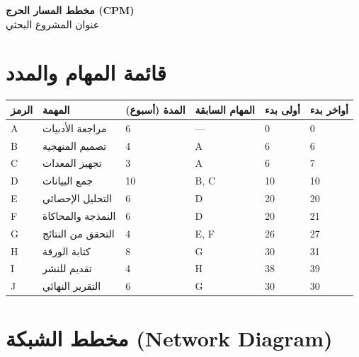 \documentclass[11pt,a4paper,landscape]{article}
\begin{document}
\begin{center}
{\LARGE\bfseries مخطط المسار الحرج (CPM)}\\[0.5em]
{\Large عنوان المشروع البحثي}\\[1em]
\end{center}

\section{قائمة المهام والمدد}
\label{sec:tasks}

\begin{table}[H]
\centering
\small
\renewcommand{\arraystretch}{1.3}
\begin{tabularx}{\textwidth}{C{1cm} L{5cm} C{2cm} C{3cm} C{2cm} C{2cm}}
\toprule
\textbf{الرمز} & \textbf{المهمة} & \textbf{المدة (أسبوع)} & \textbf{المهام السابقة} & \textbf{أولى بدء} & \textbf{أواخر بدء} \\
\midrule
A & مراجعة الأدبيات & 6 & --- & 0 & 0 \\
B & تصميم المنهجية & 4 & A & 6 & 6 \\
C & تجهيز المعدات & 3 & A & 6 & 7 \\
D & جمع البيانات & 10 & B, C & 10 & 10 \\
E & التحليل الإحصائي & 6 & D & 20 & 20 \\
F & النمذجة والمحاكاة & 6 & D & 20 & 21 \\
G & التحقق من النتائج & 4 & E, F & 26 & 27 \\
H & كتابة الورقة & 8 & G & 30 & 31 \\
I & تقديم للنشر & 4 & H & 38 & 39 \\
J & التقرير النهائي & 6 & G & 30 & 30 \\
\bottomrule
\end{tabularx}
\end{table}

\section{مخطط الشبكة (Network Diagram)}
\label{sec:network}
\end{document}
